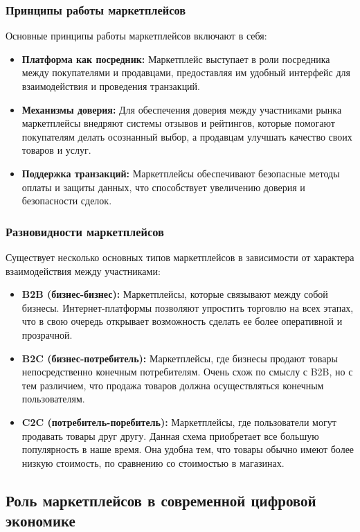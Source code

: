 \subsubsection{Принципы работы маркетплейсов}
Основные принципы работы маркетплейсов включают в себя:
\begin{itemize}
	\item \textbf{Платформа как посредник:} Маркетплейс выступает в роли посредника между покупателями и продавцами, предоставляя им удобный интерфейс для взаимодействия и проведения транзакций.
	\item \textbf{Механизмы доверия:} Для обеспечения доверия между участниками рынка маркетплейсы внедряют системы отзывов и рейтингов, которые помогают покупателям делать осознанный выбор, а продавцам улучшать качество своих товаров и услуг.
	\item \textbf{Поддержка транзакций:} Маркетплейсы обеспечивают безопасные методы оплаты и защиты данных, что способствует увеличению доверия и безопасности сделок.
\end{itemize}

\subsubsection{Разновидности маркетплейсов}
Существует несколько основных типов маркетплейсов в зависимости от характера взаимодействия между участниками:
\begin{itemize}
	\item \textbf{B2B (бизнес-бизнес):} Маркетплейсы, которые связывают между собой бизнесы. Интернет-платформы позволяют упростить торговлю на всех этапах, что в свою очередь открывает возможность сделать ее более оперативной и прозрачной.
	\item \textbf{B2C (бизнес-потребитель):} Маркетплейсы, где бизнесы продают товары непосредственно конечным потребителям. Очень схож по смыслу с B2B, но с тем различием, что продажа товаров должна осуществляться конечным пользователям.
	\item \textbf{C2C (потребитель-поребитель):} Маркетплейсы, где пользователи могут продавать товары друг другу. Данная схема приобретает все большую популярность в наше время. Она удобна тем, что товары обычно имеют более низкую стоимость, по сравнению со стоимостью в магазинах.
\end{itemize}

\subsection{Роль маркетплейсов в современной цифровой экономике}

